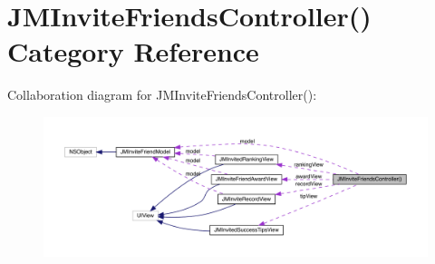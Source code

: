 \hypertarget{category_j_m_invite_friends_controller_07_08}{}\section{J\+M\+Invite\+Friends\+Controller() Category Reference}
\label{category_j_m_invite_friends_controller_07_08}


Collaboration diagram for J\+M\+Invite\+Friends\+Controller()\+:\nopagebreak
\begin{figure}[H]
\begin{center}
\leavevmode
\includegraphics[width=350pt]{category_j_m_invite_friends_controller_07_08__coll__graph}
\end{center}
\end{figure}
